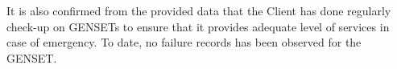 
%
%		

It is also confirmed from the provided data that the Client has done regularly check-up on GENSETs to ensure that it provides adequate level of services in case of emergency. To date, no failure records has been observed for the GENSET.%



